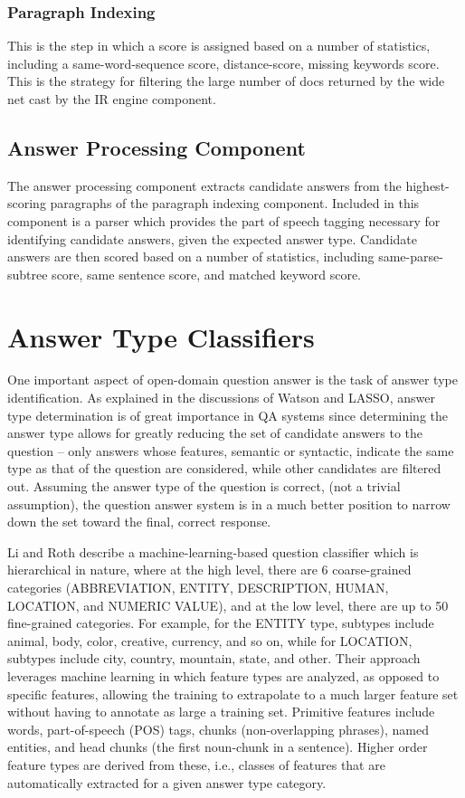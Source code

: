 \subsubsection{Paragraph Indexing}

This is the step in which a score is assigned based on a number of statistics, including a same-word-sequence score, distance-score, missing keywords score.  This is the strategy for filtering the large number of docs returned by the wide net cast by the IR engine component.

\subsection{Answer Processing Component}

The answer processing component extracts candidate answers from the highest-scoring paragraphs of the paragraph indexing component.  Included in this component is a parser which provides the part of speech tagging necessary for identifying candidate answers, given the expected answer type.  Candidate answers are then scored based on a number of statistics, including same-parse-subtree score, same sentence score, and matched keyword score.


\section{Answer Type Classifiers}

One important aspect of open-domain question answer is the task of answer type identification.  As explained in the discussions of Watson and LASSO, answer type determination is of great importance in QA systems since determining the answer type allows for greatly reducing the set of candidate answers to the question – only answers whose features, semantic or syntactic, indicate the same type as that of the question are considered, while other candidates are filtered out.  Assuming the answer type of the question is correct, (not a trivial assumption), the question answer system is in a much better position to narrow down the set toward the final, correct response.

Li and Roth \cite{li2002learning} describe a machine-learning-based question classifier which is hierarchical in nature, where at the high level, there are 6 coarse-grained categories (ABBREVIATION, ENTITY, DESCRIPTION, HUMAN, LOCATION, and NUMERIC VALUE), and at the low level, there are up to 50 fine-grained categories.  For example, for the ENTITY type, subtypes include animal, body, color, creative, currency, and so on, while for LOCATION, subtypes include city, country, mountain, state, and other.  Their approach leverages machine learning in which feature types are analyzed, as opposed to specific features, allowing the training to extrapolate to a much larger feature set without having to annotate as large a training set.  Primitive features include words, part-of-speech (POS) tags, chunks (non-overlapping phrases),  named entities, and head chunks (the first noun-chunk in a sentence).   Higher order feature types are derived from these, i.e., classes of features that are automatically extracted for a given answer type category. 

